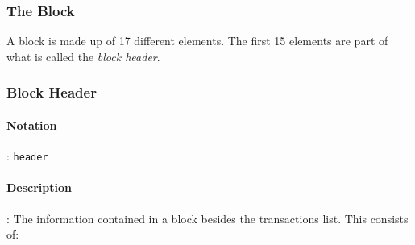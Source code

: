 \documentclass[10pt,a4paper,leqno,bibliography=totoc]{scrartcl}
\newenvironment{alphafootnotes}
{\par\edef\savedfootnotenumber{\number\value{footnote}}
\renewcommand{\thefootnote}{\alph{footnote}}
\setcounter{footnote}{0}}
{\par\setcounter{footnote}{\savedfootnotenumber}}
\begin{document}
\begin{alphafootnotes}
\begin{multicols*}{2}
			\subsubsection{The Block}
				A block is made up of 17 different elements. The first 15 elements are part of what is called the \textsl{block header}.


				\subsubsection{Block Header}
				\paragraph{Notation}: \texttt{header} 
				\paragraph{Description}: The information contained in a block besides the transactions list. This consists of:


\end{multicols*}
\end{alphafootnotes}
\end{document}
